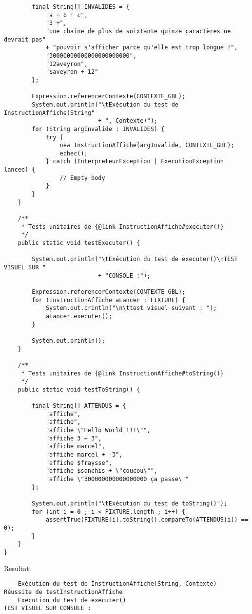 \begin{enum}
\begin{verbatim}
        final String[] INVALIDES = {
            "a = b + c",
            "3 +",
            "une chaine de plus de soixtante quinze caractères ne devrait pas"
            + "pouvoir s'afficher parce qu'elle est trop longue !",
            "30000000000000000000000",
            "12aveyron",
            "$aveyron + 12"
        };
        
        Expression.referencerContexte(CONTEXTE_GBL);
        System.out.println("\tExécution du test de InstructionAffiche(String"
                           + ", Contexte)");
        for (String argInvalide : INVALIDES) {
            try {
                new InstructionAffiche(argInvalide, CONTEXTE_GBL);
                echec();
            } catch (InterpreteurException | ExecutionException lancee) {
                // Empty body
            }
        }
    }
    
    /**
     * Tests unitaires de {@link InstructionAffiche#executer()}
     */
    public static void testExecuter() {
        
        System.out.println("\tExécution du test de executer()\nTEST VISUEL SUR "
                           + "CONSOLE :");
        
        Expression.referencerContexte(CONTEXTE_GBL);
        for (InstructionAffiche aLancer : FIXTURE) {
            System.out.println("\n\ttest visuel suivant : ");
            aLancer.executer(); 
        }
        
        System.out.println();
    }
    
    /**
     * Tests unitaires de {@link InstructionAffiche#toString()}
     */
    public static void testToString() {
        
        final String[] ATTENDUS = {
            "affiche",
            "affiche",
            "affiche \"Hello World !!!\"",
            "affiche 3 + 3",
            "affiche marcel",
            "affiche marcel + -3",
            "affiche $fraysse",
            "affiche $sanchis + \"coucou\"",
            "affiche \"300000000000000000 ça passe\""
        };
        
        System.out.println("\tExécution du test de toString()");
        for (int i = 0 ; i < FIXTURE.length ; i++) {
            assertTrue(FIXTURE[i].toString().compareTo(ATTENDUS[i]) == 0);
        }
    }
}
\end{verbatim}
Resultat:
\begin{verbatim}
    Exécution du test de InstructionAffiche(String, Contexte)
Réussite de testInstructionAffiche
    Exécution du test de executer()
TEST VISUEL SUR CONSOLE :


\end{verbatim}
\end{enum}

